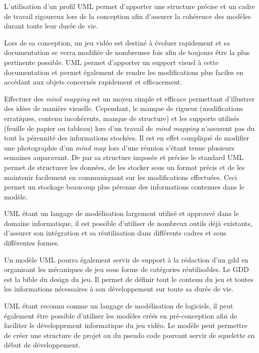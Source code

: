 L'utilisation d'un profil UML permet d'apporter une structure précise et un cadre de travail rigoureux lors de la conception afin d'assurer la cohérence des modèles durant toute leur durée de vie.

Lors de sa conception, un jeu vidéo est destiné à évoluer rapidement et sa documentation se verra modifiée de nombreuses fois afin de toujours être la plus pertinente possible. UML permet d'apporter un support visuel à cette documentation et permet également de rendre les modifications plus faciles en accédant aux objets concernés rapidement et efficacement. 

Effectuer des \emph{mind mapping} est un moyen simple et efficace permettant d'illustrer des idées de manière visuelle. Cependant, le manque de rigueur (modifications erratiques, contenu incohérents, manque de structure) et les supports utilisés (feuille de papier ou tableau) lors d'un travail de \emph{mind mapping} n'assurent pas du tout la pérennité des informations stockées. Il est en effet compliqué de modifier une photographie d'un \emph{mind map} lors d'une réunion s'étant tenue plusieurs semaines auparavant. De par sa structure imposée et précise le standard UML permet de structurer les données, de les stocker sous un format précis et de les maintenir facilement en communiquant sur les modifications effectuées. Ceci permet un stockage beaucoup plus pérenne des informations contenues dans le modèle.

UML étant un langage de modélisation largement utilisé et approuvé dans le domaine informatique, il est possible d'utiliser de nombreux outils d\'ej\`a existants, d'assurer son intégration et sa réutilisation dans différents cadres et sous différentes formes.

Un modèle UML pourra également servir de support à la rédaction d'un \gls{gdd} en organisant les mécaniques de jeu sous forme de catégories réutilisables. Le GDD est la \guillemotleft bible du design \guillemotright \cite{GD_foundations_pedersen} du jeu. Il permet de définir tout le contenu du jeu et toutes les informations nécessaires à son développement sur toute sa durée de vie. 

UML étant reconnu comme un langage de modélisation de logiciels, il peut également être possible d'utiliser les modèles créés en pré-conception afin de faciliter le développement informatique du jeu vidéo. Le modèle peut permettre de créer une structure de projet ou du pseudo code pouvant servir de squelette en début de développement.


